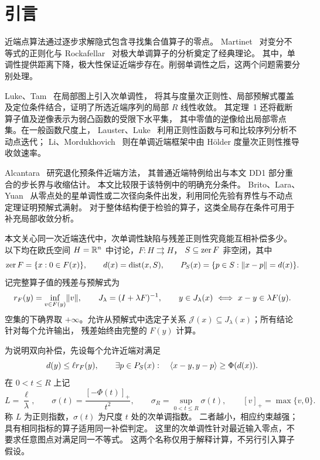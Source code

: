 \section{引言}\label{sec:intro}

近端点算法通过逐步求解隐式包含寻找集合值算子的零点。
Martinet~\cite{Martinet1970} 对变分不等式的正则化与
Rockafellar~\cite{Rockafellar1976} 对极大单调算子的分析奠定了经典理论。
其中，单调性提供距离下降，极大性保证近端步存在。削弱单调性之后，这两个问题需要分别处理。

Luke、Tam~\cite{LukeTam2025} 在局部图上引入次单调性，
将其与度量次正则性、局部预解式覆盖及定位条件结合，证明了所选近端序列的局部 $R$ 线性收敛。
其定理~1 还将截断算子值及逆像表示为弱凸函数的受限下水平集，
其中零值的逆像给出局部零点集。在一般函数尺度上，
Lauster、Luke~\cite[定理~16、引理~17、推论~19]{LausterLuke2021}
利用正则性函数与可和比较序列分析不动点迭代；
Li、Mordukhovich~\cite[定理~7.3]{LiMordukhovich2012}
则在单调近端框架中由 H\"older 度量次正则性推导收敛速率。

Alcantara~\cite[命题~3.4、注~3.5]{Alcantara2026} 研究退化预条件近端方法，
其普通近端特例给出与本文 DD1 部分重合的步长界与收缩估计。
本文比较限于该特例中的明确充分条件。
Brito、Lara、Yuan~\cite[定理~3.1、推论~3.12]{BritoLaraYuan2026}
从零点处的星单调性或二次径向条件出发，利用同伦先验有界性与不动点定理证明预解式满射。
对于整体结构便于检验的算子，这类全局存在条件可用于补充局部收敛分析。

本文关心同一次近端迭代中，次单调性缺陷与残差正则性究竟能互相补偿多少。
以下均在欧氏空间 $H=\mathbb R^n$ 中讨论，$F:H\rightrightarrows H$，
$S\subseteq\operatorname{zer} F$ 非空闭，其中
\[
 \operatorname{zer} F=\{x:0\in F(x)\},\qquad d(x)=\operatorname{dist}(x,S),\qquad
 P_S(x)=\{p\in S:\lVert x-p\rVert=d(x)\}.
\]
记完整算子值的残差与预解式为
\begin{equation}\label{eq:intro-notation}
 r_F(y)=\inf_{v\in F(y)}\lVert v\rVert,\qquad
 J_\lambda=(I+\lambda F)^{-1},\qquad
 y\in J_\lambda(x)\ \Longleftrightarrow\ x-y\in\lambda F(y).
\end{equation}
空集的下确界取 $+\infty$。允许从预解式中选定子关系
$\mathcal J(x)\subseteq J_\lambda(x)$；所有结论针对每个允许输出，
残差始终由完整的 $F(y)$ 计算。

为说明双向补偿，先设每个允许近端对满足
\begin{equation}\label{eq:intro-two-assumptions}
 d(y)\le\ell r_F(y),\qquad
 \exists p\in P_S(x):\quad \langle x-y,y-p\rangle\ge\Phi(d(x)).
\end{equation}
在 $0<t\le R$ 上记
\begin{equation}\label{eq:intro-indices}
 L=\frac{\ell}{\lambda},\qquad
 \sigma(t)=\frac{[-\Phi(t)]_+}{t^2},\qquad
 \sigma_R=\sup_{0<t\le R}\sigma(t),\qquad [v]_+=\max\{v,0\}.
\end{equation}
称 $L$ 为正则指数，$\sigma(t)$ 为尺度 $t$ 处的次单调指数。
二者越小，相应约束越强；具有相同指标的算子适用同一补偿判定。
这里的次单调性针对最近输入零点，不要求任意图点对满足同一不等式。
这两个名称仅用于解释计算，不另行引入算子假设。

